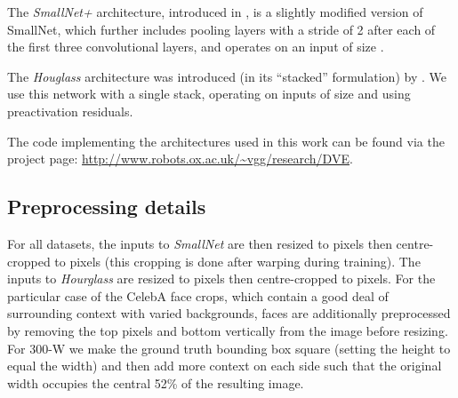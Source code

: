 \documentclass[10pt,twocolumn,letterpaper]{article}
\begin{document}
The \textit{SmallNet+} architecture, introduced in \cite{thewlis17unsupervised}, is a slightly modified version of SmallNet, which further includes pooling layers with a stride of 2 after each of the first three convolutional layers, and operates on an input of size .

The \textit{Houglass} architecture was introduced (in its ``stacked'' formulation) by \cite{newell2016stacked}.  We use this network with a single stack, operating on inputs of size  and using preactivation residuals.  

The code implementing the architectures used in this work can be found via the project page: \url{http://www.robots.ox.ac.uk/~vgg/research/DVE}.

\subsection{Preprocessing details}

For all datasets, the inputs to \textit{SmallNet} are then resized to  pixels then centre-cropped to  pixels (this cropping is done after warping during training).  The inputs to \textit{Hourglass} are resized to  pixels then centre-cropped to  pixels.  For the particular case of the CelebA face crops, which contain a good deal of surrounding context with varied backgrounds, faces are additionally preprocessed by removing the top  pixels and bottom  vertically from the  image before resizing. For 300-W we make the ground truth bounding box square (setting the height to equal the width) and then add more context on each side such that the original width occupies the central 52\% of the resulting image.
 
\end{document}
